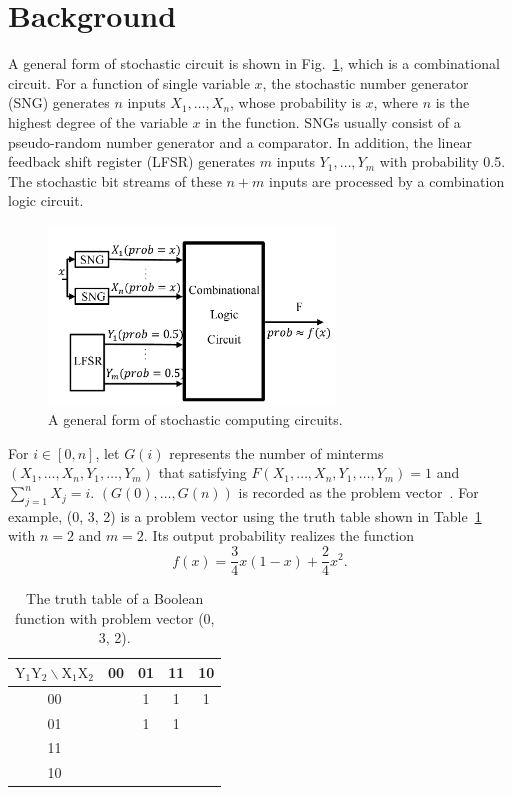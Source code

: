 \documentclass[conference,letterpaper]{IEEEtran}
\begin{document}
\section*{Background}
A general form of stochastic circuit is shown in Fig.~\ref{fig2}, which is a combinational circuit. For a function of single variable $x$, the stochastic number generator (SNG) generates $n$ inputs $X_{1}, \ldots, X_{n}$, whose probability is $x$, where $n$ is the highest degree of the variable $x$ in the function. SNGs usually consist of a pseudo-random number generator and a comparator. In addition, the linear feedback shift register (LFSR) generates $m$ inputs $Y_{1}, \ldots, Y_{m}$ with probability 0.5. The stochastic bit streams of these $n+m$ inputs are processed by a combination logic circuit.

\begin{figure}[t]
	\centering
	\includegraphics[width=3in]{fig/sc.pdf}	
	\caption{\label{fig2}A general form of stochastic computing circuits.} \vspace{-2ex}
\end{figure}

For $i\in[0,n]$, let $G(i)$ represents the number of minterms $(X_{1}, \ldots, X_{n}, Y_{1}, \ldots, Y_{m})$ that satisfying $F(X_{1}, \ldots, X_{n}, Y_{1}, \ldots, Y_{m})=1$ and $\sum_{j=1}^{n} X_{j}=i$. $(G(0), \ldots, G(n))$ is recorded as the problem vector~\cite{2}. For example, (0, 3, 2) is a problem vector using the truth table shown in Table~\ref{tab:tt} with $n=2$ and $m=2$. Its output probability realizes the function
\begin{equation}
f(x)=\frac{3}{4} x(1-x)+\frac{2}{4} x^{2}.
\end{equation}

\begin{table}[htbp]
\setlength{\abovecaptionskip}{0.cm}
\setlength{\belowcaptionskip}{0.pt}
\setlength{\tabcolsep}{1mm}
\caption{The truth table of a Boolean function with problem vector (0, 3, 2).}
\centering \label{tab:tt}
\begin{tabular}{|c|c|c|c|c|}
\hline $\mathrm{Y}_{1} \mathrm{Y}_{2} \backslash \mathrm{X}_{1} \mathrm{X}_{2}$ & 00 & 01 & 11 & 10 \\
\hline 00 & & 1 & 1 & 1 \\
\hline 01 & & 1 & 1 & \\
\hline 11 & & & & \\
\hline 10 & & & & \\
\hline
\end{tabular}
\end{table}
\end{document}
